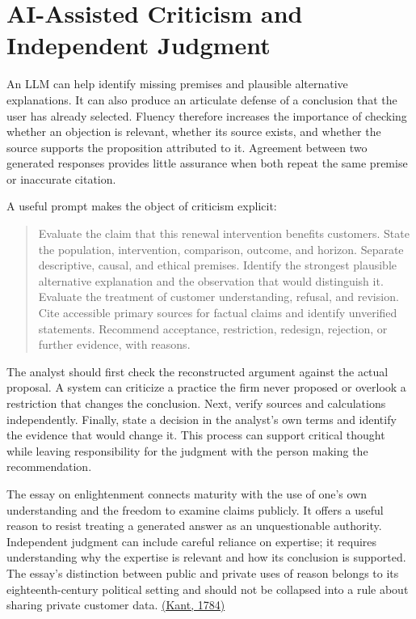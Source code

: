 
\hypertarget{M09-ai-assisted-criticism-and-independent-judgment}{%
\section{AI-Assisted Criticism and Independent
Judgment}\label{M09-ai-assisted-criticism-and-independent-judgment}}

\noindent \noindent An LLM can help identify missing premises and plausible
alternative explanations. It can also produce an articulate defense of a
conclusion that the user has already selected. Fluency therefore
increases the importance of checking whether an objection is relevant,
whether its source exists, and whether the source supports the
proposition attributed to it. Agreement between two generated responses
provides little assurance when both repeat the same premise or
inaccurate citation.

A useful prompt makes the object of criticism explicit:

\begin{quote}
Evaluate the claim that this renewal intervention benefits customers.
State the population, intervention, comparison, outcome, and horizon.
Separate descriptive, causal, and ethical premises. Identify the
strongest plausible alternative explanation and the observation that
would distinguish it. Evaluate the treatment of customer understanding,
refusal, and revision. Cite accessible primary sources for factual
claims and identify unverified statements. Recommend acceptance,
restriction, redesign, rejection, or further evidence, with reasons.
\end{quote}

The analyst should first check the reconstructed argument against the
actual proposal. A system can criticize a practice the firm never
proposed or overlook a restriction that changes the conclusion. Next,
verify sources and calculations independently. Finally, state a decision
in the analyst's own terms and identify the evidence that would change
it. This process can support critical thought while leaving
responsibility for the judgment with the person making the
recommendation.

The essay on enlightenment connects maturity with the use of one's own
understanding and the freedom to examine claims publicly. It offers a
useful reason to resist treating a generated answer as an unquestionable
authority. Independent judgment can include careful reliance on
expertise; it requires understanding why the expertise is relevant and
how its conclusion is supported. The essay's distinction between public
and private uses of reason belongs to its eighteenth-century political
setting and should not be collapsed into a rule about sharing private
customer data.
\href{https://users.manchester.edu/facstaff/ssnaragon/online/texts/318/kant\%2C\%20enlightenment.pdf}{(Kant,
1784)}

